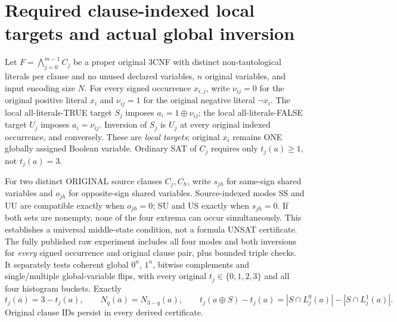 \documentclass[10pt]{article}
\begin{document}
\section{Required clause-indexed local targets and actual global inversion}
Let $F=\bigwedge_{j=0}^{m-1} C_j$ be a proper original 3CNF with distinct non-tautological literals per clause and no unused declared variables, $n$ original variables, and input encoding size $N$. For every signed occurrence $x_{i,j}$, write $\nu_{ij}=0$ for the original positive literal $x_i$ and $\nu_{ij}=1$ for the original negative literal $\neg x_i$. The local all-literals-TRUE target $S_j$ imposes $a_i=1\oplus\nu_{ij}$; the local all-literals-FALSE target $U_j$ imposes $a_i=\nu_{ij}$. Inversion of $S_j$ is $U_j$ at every original indexed occurrence, and conversely. These are \emph{local targets}; original $x_i$ remains ONE globally assigned Boolean variable. Ordinary SAT of $C_j$ requires only $t_j(a)\ge1$, not $t_j(a)=3$.

For two distinct ORIGINAL source clauses $C_j,C_h$, write $s_{jh}$ for same-sign shared variables and $o_{jh}$ for opposite-sign shared variables. Source-indexed modes SS and UU are compatible exactly when $o_{jh}=0$; SU and US exactly when $s_{jh}=0$. If both sets are nonempty, none of the four extrema can occur simultaneously. This establishes a universal middle-state condition, not a formula UNSAT certificate. The fully published raw experiment includes all four modes and both inversions for \emph{every} signed occurrence and original clause pair, plus bounded triple checks. It separately tests coherent global $0^n$, $1^n$, bitwise complements and single/multiple global-variable flips, with every original $t_j\in\{0,1,2,3\}$ and all four histogram buckets. Exactly
\[
 t_j(\overline a)=3-t_j(a),\qquad N_q(\overline a)=N_{3-q}(a),\qquad
 t_j(a\oplus S)-t_j(a)=|S\cap L^0_j(a)|-|S\cap L^1_j(a)|.
\]
Original clause IDs persist in every derived certificate.
\end{document}
